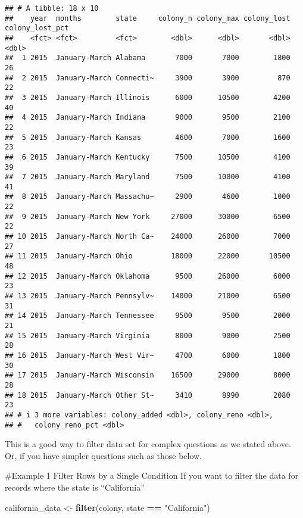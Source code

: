 \documentclass[
]{article}
\newenvironment{Shaded}{\begin{snugshade}}{\end{snugshade}}
\newcommand{\FunctionTok}[1]{\textcolor[rgb]{0.13,0.29,0.53}{\textbf{#1}}}
\newcommand{\NormalTok}[1]{#1}
\newcommand{\OtherTok}[1]{\textcolor[rgb]{0.56,0.35,0.01}{#1}}
\newcommand{\SpecialCharTok}[1]{\textcolor[rgb]{0.81,0.36,0.00}{\textbf{#1}}}
\newcommand{\StringTok}[1]{\textcolor[rgb]{0.31,0.60,0.02}{#1}}
\begin{document}
\begin{verbatim}
## # A tibble: 18 x 10
##    year  months        state     colony_n colony_max colony_lost colony_lost_pct
##    <fct> <fct>         <fct>        <dbl>      <dbl>       <dbl>           <dbl>
##  1 2015  January-March Alabama       7000       7000        1800              26
##  2 2015  January-March Connecti~     3900       3900         870              22
##  3 2015  January-March Illinois      6000      10500        4200              40
##  4 2015  January-March Indiana       9000       9500        2100              22
##  5 2015  January-March Kansas        4600       7000        1600              23
##  6 2015  January-March Kentucky      7500      10500        4100              39
##  7 2015  January-March Maryland      7500      10000        4100              41
##  8 2015  January-March Massachu~     2900       4600        1000              22
##  9 2015  January-March New York     27000      30000        6500              22
## 10 2015  January-March North Ca~    24000      26000        7000              27
## 11 2015  January-March Ohio         18000      22000       10500              48
## 12 2015  January-March Oklahoma      9500      26000        6000              23
## 13 2015  January-March Pennsylv~    14000      21000        6500              31
## 14 2015  January-March Tennessee     9500       9500        2000              21
## 15 2015  January-March Virginia      8000       9000        2500              28
## 16 2015  January-March West Vir~     4700       6000        1800              30
## 17 2015  January-March Wisconsin    16500      29000        8000              28
## 18 2015  January-March Other St~     3410       8990        2080              23
## # i 3 more variables: colony_added <dbl>, colony_reno <dbl>,
## #   colony_reno_pct <dbl>
\end{verbatim}

This is a good way to filter data set for complex questions as we stated
above. Or, if you have simpler questions such as those below.

\#Example 1 Filter Rows by a Single Condition If you want to filter the
data for records where the state is ``California''

\begin{Shaded}
\begin{Highlighting}[]
\NormalTok{california\_data }\OtherTok{\textless{}{-}} \FunctionTok{filter}\NormalTok{(colony, state }\SpecialCharTok{==} \StringTok{"California"}\NormalTok{)}
\end{Highlighting}
\end{Shaded}
\end{document}
